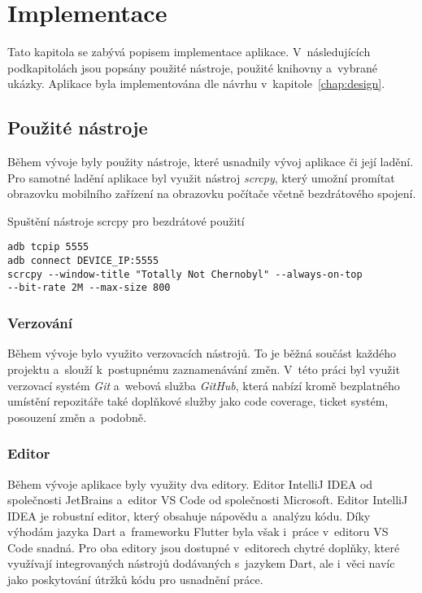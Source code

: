 \chapter{Implementace}
\label{chap:implementation}

Tato kapitola se zabývá popisem implementace aplikace.
V~následujících podkapitolách jsou popsány použité nástroje,
použité knihovny a~vybrané ukázky.
Aplikace byla implementována dle návrhu v~kapitole~\ref{chap:design}.

\section{Použité nástroje}

Během vývoje byly použity nástroje,
které usnadnily vývoj aplikace či její ladění.
Pro samotné ladění aplikace byl využit nástroj \emph{scrcpy},
který umožní promítat obrazovku mobilního zařízení na obrazovku počítače
včetně bezdrátového spojení.

\begin{listing}
    \caption{Spuštění nástroje scrcpy pro bezdrátové použití}
    \label{code:scrcpy}
    \begin{verbatim}
adb tcpip 5555
adb connect DEVICE_IP:5555
scrcpy --window-title "Totally Not Chernobyl" --always-on-top
--bit-rate 2M --max-size 800
    \end{verbatim}
\end{listing}

\subsection{Verzování}

Během vývoje bylo využito verzovacích nástrojů.
To je běžná součást každého projektu a~slouží k~postupnému zaznamenávání změn.
V~této práci byl využit verzovací systém \emph{Git} a~webová služba \emph{GitHub},
která nabízí kromě bezplatného umístění repozitáře také doplňkové služby jako
code coverage, ticket systém, posouzení změn a~podobně.

\subsection{Editor}

Během vývoje aplikace byly využity dva editory.
Editor IntelliJ IDEA od společnosti JetBrains
a~editor VS Code od společnosti Microsoft.
Editor IntelliJ IDEA je robustní editor,
který obsahuje nápovědu a~analýzu kódu.
Díky výhodám jazyka Dart a~frameworku Flutter
byla však i~práce v~editoru VS Code snadná.
Pro oba editory jsou dostupné v~editorech chytré doplňky,
které využívají integrovaných nástrojů dodávaných s~jazykem Dart,
ale i~věci navíc jako poskytování útržků kódu pro usnadnění práce.

